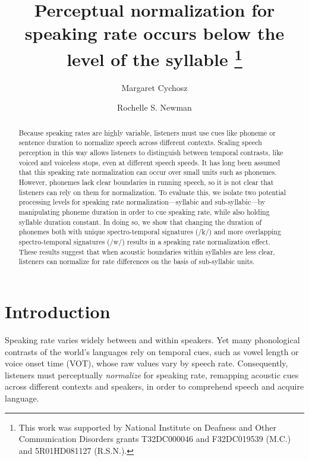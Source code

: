 \documentclass[preprint]{JASA}
\begin{document}


\title{Perceptual normalization for speaking rate occurs below the level of the syllable \thanks{This work was supported by National Institute on Deafness and Other Communication Disorders grants T32DC000046 and F32DC019539 (M.C.) and 5R01HD081127 (R.S.N.).}}

\author{Margaret Cychosz}
\author{Rochelle S. Newman}


\begin{abstract} 
Because speaking rates are highly variable, listeners must use cues like phoneme or sentence duration to normalize speech across different contexts. Scaling speech perception in this way allows listeners to distinguish between temporal contrasts, like voiced and voiceless stops, even at different speech speeds. It has long been assumed that this speaking rate normalization can occur over small units such as phonemes. However, phonemes lack clear boundaries in running speech, so it is not clear that listeners can rely on them for normalization. To evaluate this, we isolate two potential processing levels for speaking rate normalization---syllabic and sub-syllabic---by manipulating phoneme duration in order to cue speaking rate, while also holding syllable duration constant. In doing so, we show that changing the duration of phonemes both with unique spectro-temporal signatures (/k\textscripta/) and more overlapping spectro-temporal signatures (/w\textsci/) results in a speaking rate normalization effect. These results suggest that when acoustic boundaries within syllables are less clear, listeners can normalize for rate differences on the basis of sub-syllabic units.

\end{abstract}

\maketitle


\section{Introduction}\label{intro}

Speaking rate varies widely between and within speakers. Yet many phonological contrasts of the world's languages rely on temporal cues, such as vowel length or voice onset time (VOT), whose raw values vary by speech rate. Consequently, listeners must perceptually \textit{normalize} for speaking rate, remapping acoustic cues across different contexts and speakers, in order to comprehend speech and acquire language. 
\end{document}

